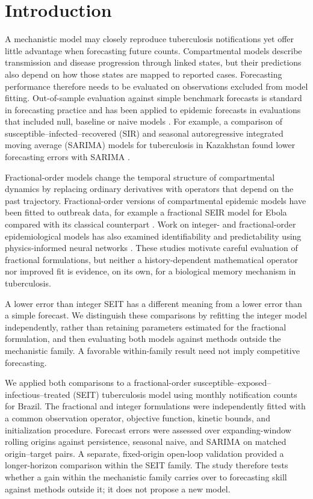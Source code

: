 \documentclass[pdflatex,sn-mathphys-ay]{sn-jnl}
\begin{document}
\section{Introduction}
A mechanistic model may closely reproduce tuberculosis notifications yet offer little advantage when forecasting future counts. Compartmental models describe transmission and disease progression through linked states, but their predictions also depend on how those states are mapped to reported cases. Forecasting performance therefore needs to be evaluated on observations excluded from model fitting. Out-of-sample evaluation against simple benchmark forecasts is standard in forecasting practice \citep{tashman2000,hyndman2006,petropoulos2022} and has been applied to epidemic forecasts in evaluations that included null, baseline or naive models \citep{funk2019,reich2019,cramer2022}. For example, a comparison of susceptible--infected--recovered (SIR) and seasonal autoregressive integrated moving average (SARIMA) models for tuberculosis in Kazakhstan found lower forecasting errors with SARIMA \citep{kalizhanova2024}.

Fractional-order models change the temporal structure of compartmental dynamics by replacing ordinary derivatives with operators that depend on the past trajectory. Fractional-order versions of compartmental epidemic models have been fitted to outbreak data, for example a fractional SEIR model for Ebola compared with its classical counterpart \citep{area2015}. Work on integer- and fractional-order epidemiological models has also examined identifiability and predictability using physics-informed neural networks \citep{kharazmi2021}. These studies motivate careful evaluation of fractional formulations, but neither a history-dependent mathematical operator nor improved fit is evidence, on its own, for a biological memory mechanism in tuberculosis.

A lower error than integer SEIT has a different meaning from a lower error than a simple forecast. We distinguish these comparisons by refitting the integer model independently, rather than retaining parameters estimated for the fractional formulation, and then evaluating both models against methods outside the mechanistic family. A favorable within-family result need not imply competitive forecasting.

We applied both comparisons to a fractional-order susceptible--exposed--infectious--treated (SEIT) tuberculosis model using monthly notification counts for Brazil. The fractional and integer formulations were independently fitted with a common observation operator, objective function, kinetic bounds, and initialization procedure. Forecast errors were assessed over expanding-window rolling origins against persistence, seasonal naive, and SARIMA on matched origin--target pairs. A separate, fixed-origin open-loop validation provided a longer-horizon comparison within the SEIT family. The study therefore tests whether a gain within the mechanistic family carries over to forecasting skill against methods outside it; it does not propose a new model.
\end{document}
